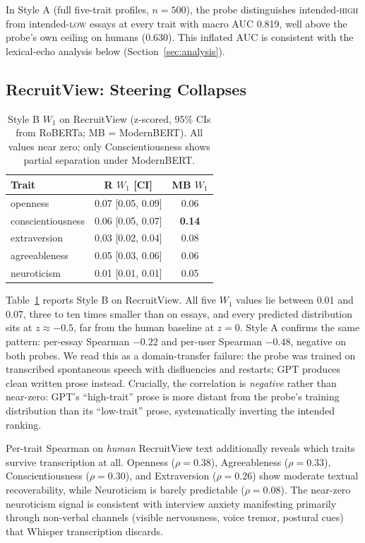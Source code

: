 \documentclass[10pt, a4paper]{article}
\begin{document}
In Style A (full five-trait profiles, $n=500$), the probe distinguishes intended-\textsc{high} from intended-\textsc{low} essays at every trait with macro AUC 0.819, well above the probe's own ceiling on humans (0.630). This inflated AUC is consistent with the lexical-echo analysis below (Section~\ref{sec:analysis}).

\subsection{RecruitView: Steering Collapses}

\begin{table}[t]
\caption{Style B $W_1$ on RecruitView (z-scored, 95\% CIs from RoBERTa; MB = ModernBERT). All values near zero; only Conscientiousness shows partial separation under ModernBERT.}
\label{tab:styleb-rv}
\begin{center}
\small
\begin{tabular}{lcc}
\toprule
Trait & R $W_1$ [CI] & MB $W_1$ \\
\midrule
openness          & 0.07 [0.05, 0.09] & 0.06 \\
conscientiousness & 0.06 [0.05, 0.07] & \textbf{0.14} \\
extraversion      & 0.03 [0.02, 0.04] & 0.08 \\
agreeableness     & 0.05 [0.03, 0.06] & 0.06 \\
neuroticism       & 0.01 [0.01, 0.01] & 0.05 \\
\bottomrule
\end{tabular}
\end{center}
\end{table}

Table~\ref{tab:styleb-rv} reports Style B on RecruitView. All five $W_1$ values lie between 0.01 and 0.07, three to ten times smaller than on essays, and every predicted distribution sits at $z\approx -0.5$, far from the human baseline at $z=0$. Style A confirms the same pattern: per-essay Spearman $-0.22$ and per-user Spearman $-0.48$, negative on both probes. We read this as a domain-transfer failure: the probe was trained on transcribed spontaneous speech with disfluencies and restarts; GPT produces clean written prose instead. Crucially, the correlation is \emph{negative} rather than near-zero: GPT's ``high-trait'' prose is more distant from the probe's training distribution than its ``low-trait'' prose, systematically inverting the intended ranking.

Per-trait Spearman on \emph{human} RecruitView text additionally reveals which traits survive transcription at all. Openness ($\rho=0.38$), Agreeableness ($\rho=0.33$), Conscientiousness ($\rho=0.30$), and Extraversion ($\rho=0.26$) show moderate textual recoverability, while Neuroticism is barely predictable ($\rho=0.08$). The near-zero neuroticism signal is consistent with interview anxiety manifesting primarily through non-verbal channels (visible nervousness, voice tremor, postural cues) that Whisper transcription discards.
\end{document}
